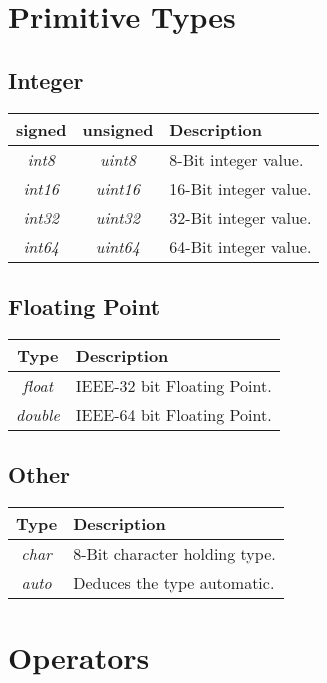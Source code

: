 \documentclass[11pt,a4paper]{article}
\begin{document}
\section{Primitive Types}


\subsection{Integer}
\begin{tabular}{c|c|l}
signed			& unsigned			 	& Description\\ \hline
\textit{int8}	& \textit{uint8}		& 8-Bit integer value. \\
\textit{int16}	& \textit{uint16}		& 16-Bit integer value. \\
\textit{int32}	& \textit{uint32}		& 32-Bit integer value. \\
\textit{int64}	& \textit{uint64}		& 64-Bit integer value. \\
\end{tabular}


\subsection{Floating Point}

\begin{tabular}{c|l}
Type			& Description \\ \hline
\textit{float}	& IEEE-32 bit Floating Point. \\
\textit{double}	& IEEE-64 bit Floating Point. \\
\end{tabular}



\subsection{Other}


\begin{tabular}{c|l}
Type			& Description \\ \hline
\textit{char}	& 8-Bit character holding type. \\
\textit{auto}	& Deduces the type automatic. \\
\end{tabular}



\section{Operators}
\end{document}
